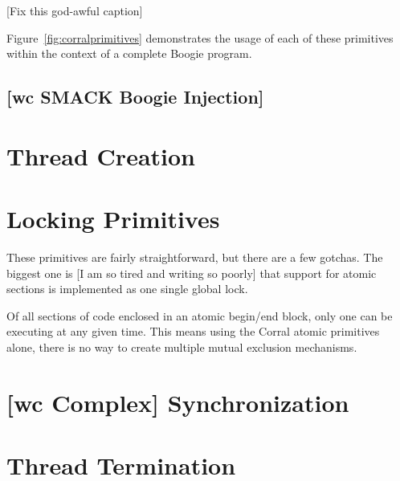 [Fix this god-awful caption]

Figure~\ref{fig:corralprimitives} demonstrates the usage of each of these primitives within the context of a complete Boogie program.

\subsection{[wc SMACK Boogie Injection]}


\section{Thread Creation}

\section{Locking Primitives}
These primitives are fairly straightforward, but there are a few gotchas.  The biggest one is [I am so tired and writing so poorly] that support for atomic sections is implemented as one single global lock.  

Of all sections of code enclosed in an atomic begin/end block, only one can be executing at any given time.  This means using the Corral atomic primitives alone, there is no way to create multiple mutual exclusion mechanisms.

\section{[wc Complex] Synchronization}

\section{Thread Termination}

